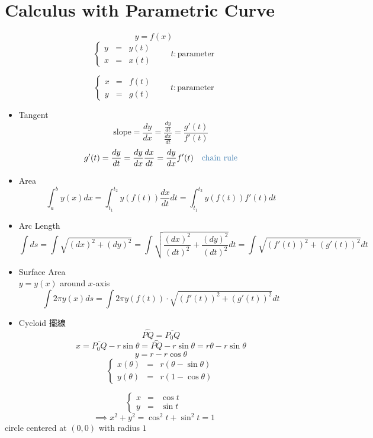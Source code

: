 \section{Calculus with Parametric Curve}
\begin{defn}
\[y = f(x)\]
\[\left\{ \begin{array}{rcl}
y & = & y(t)\\
x & = & x(t)
\end{array} \right. \quad \quad t : \text{parameter}\]
\end{defn}
\begin{notn}
\[\left\{ \begin{array}{rcl}
x & = & f(t)\\
y & = & g(t)
\end{array} \right. \quad \quad t : \text{parameter}\]
\begin{itemize}
\item Tangent
\[\text{slope} \displaystyle = \frac{dy}{dx} = \frac{\frac{dy}{dt}}{\frac{dx}{dt}} = \frac{g'(t)}{f'(t)}\]
\[\displaystyle g'(t) = \frac{dy}{dt} = \frac{dy}{dx} \frac{dx}{dt} = \frac{dy}{dx}f'(t) \quad \text{\tssteelblue{chain rule}}\]
\item Area
\[\displaystyle \int^b_a y(x)dx = \int^{t_2}_{t_1} y(f(t)) \frac{dx}{dt} dt = \int^{t_2}_{t_1} y(f(t))f'(t)dt\]
\item Arc Length
\[\displaystyle \int ds = \int \sqrt{(dx)^2 +(dy)^2} = \int \sqrt{\frac{(dx)^2}{(dt)^2} + \frac{(dy)^2}{(dt)^2}} dt = \int \sqrt{(f'(t))^2 + (g'(t))^2}dt\]
\item Surface Area\\
\(y = y(x)\) around \(x\)-axis
\[\displaystyle \int 2 \pi y(x)ds = \int 2 \pi y(f(t)) \cdot \sqrt{(f'(t))^2 + (g'(t))^2} dt\]
\item Cycloid 擺線
\[\overset\frown{PQ} = \overline{P_0 Q}\]
\[x = \overline{P_0Q} - r \sin \theta = \overset\frown{PQ} - r \sin \theta = r \theta - r \sin \theta\]
\[y = r - r \cos \theta\]
\[\left\{\begin{array}{rcl}
x(\theta) & = & r(\theta - \sin \theta)\\
y(\theta) & = & r(1 - \cos \theta)
\end{array}\right.\]
\end{itemize}
\end{notn}
\begin{eg}
\[\left\{ \begin{array}{rcl}
x & = & \cos t\\
y & = & \sin t
\end{array} \right.\] 
\[\implies x^2 + y^2 = \cos^2 t + \sin^2 t = 1\]
circle centered at \((0, 0)\) with radius \(1\)
\end{eg}
